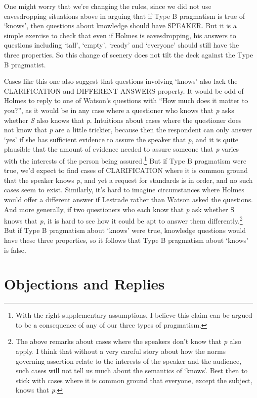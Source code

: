 \documentclass[
  10pt,
  letterpaper,
  DIV=11,
  numbers=noendperiod,
  twoside]{scrartcl}
\begin{document}
One might worry that we're changing the rules, since we did not use
eavesdropping situations above in arguing that if Type B pragmatism is
true of `knows', then questions about knowledge should have SPEAKER. But
it is a simple exercise to check that even if Holmes is eavesdropping,
his answers to questions including `tall', `empty', `ready' and
`everyone' should still have the three properties. So this change of
scenery does not tilt the deck against the Type B pragmatist.

Cases like this one also suggest that questions involving `knows' also
lack the CLARIFICATION and DIFFERENT ANSWERS property. It would be odd
of Holmes to reply to one of Watson's questions with ``How much does it
matter to you?'', as it would be in any case where a questioner who
knows that \emph{p} asks whether \emph{S} also knows that \emph{p}.
Intuitions about cases where the questioner does not know that \emph{p}
are a little trickier, because then the respondent can only answer `yes'
if she has sufficient evidence to assure the speaker that \emph{p}, and
it is quite plausible that the amount of evidence needed to assure
someone that \emph{p} varies with the interests of the person being
assured.\footnote{With the right supplementary assumptions, I believe
  this claim can be argued to be a consequence of any of our three types
  of pragmatism.} But if Type B pragmatism were true, we'd expect to
find cases of CLARIFICATION where it is common ground that the speaker
knows \emph{p}, and yet a request for standards is in order, and no such
cases seem to exist. Similarly, it's hard to imagine circumstances where
Holmes would offer a different answer if Lestrade rather than Watson
asked the questions. And more generally, if two questioners who each
know that \emph{p} ask whether S knows that \emph{p}, it is hard to see
how it could be apt to answer them differently.\footnote{The above
  remarks about cases where the speakers don't know that \emph{p} also
  apply. I think that without a very careful story about how the norms
  governing assertion relate to the interests of the speaker and the
  audience, such cases will not tell us much about the semantics of
  `knows'. Best then to stick with cases where it is common ground that
  everyone, except the subject, knows that \emph{p}.} But if Type B
pragmatism about `knows' were true, knowledge questions would have these
three properties, so it follows that Type B pragmatism about `knows' is
false.

\section{Objections and Replies}\label{objections-and-replies}
\end{document}
